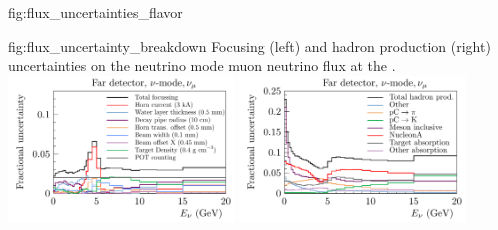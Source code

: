 \begin{dunefigure}{fig:flux_uncertainties_flavor}
    \end{dunefigure}


\begin{dunefigure}{fig:flux_uncertainty_breakdown}
{Focusing (left) and hadron production (right) uncertainties on the neutrino mode muon neutrino flux at the .}
  \includegraphics[width=0.45\textwidth]{graphics/NonHP_FD_numu_ErrBreakdown_left.pdf}
  \includegraphics[width=0.45\textwidth]{graphics/HP_FD_numu_ErrBreakdown_right.pdf}
\end{dunefigure}

